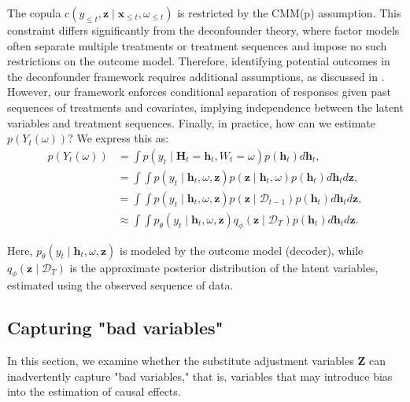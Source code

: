 \documentclass[10pt]{article} %
\begin{document}
The copula \(c(y_{\leq t}, \mathbf{z} \mid \mathbf{x}_{\leq t}, \omega_{\leq t})\) is restricted by the CMM(p) assumption. This constraint differs significantly from the deconfounder theory, where factor models often separate multiple treatments or treatment sequences and impose no such restrictions on the outcome model. Therefore, identifying potential outcomes in the deconfounder framework requires additional assumptions, as discussed in \cite{wang2019blessings, wang2019blessingsreply}. However, our framework enforces conditional separation of responses given past sequences of treatments and covariates, implying independence between the latent variables and treatment sequences.
Finally, in practice, how can we estimate \(p(Y_{t}(\omega))\)? We express this as:
\begin{equation}
\begin{aligned}
p(Y_{t}(\omega)) &= \int p(y_{t} \mid \mathbf{H}_t =  \mathbf{h}_t, W_t = \omega) p(\mathbf{h}_t) d\mathbf{h}_t, \\
&= \int \int  p(y_{t} \mid \mathbf{h}_t, \omega, \mathbf{z}) p(\mathbf{z} \mid \mathbf{h}_t, \omega) p(\mathbf{h}_t) d\mathbf{h}_t d\mathbf{z}, \\
&= \int \int p(y_{t} \mid \mathbf{h}_t, \omega, \mathbf{z}) p(\mathbf{z} \mid \mathcal{D}_{t-1}) p(\mathbf{h}_t) d\mathbf{h}_t d\mathbf{z}, \\
&\approx \int \int p_{\theta}(y_{t} \mid \mathbf{h}_t, \omega, \mathbf{z}) q_{\phi}(\mathbf{z} \mid \mathcal{D}_{T}) p(\mathbf{h}_t) d\mathbf{h}_t d\mathbf{z}.
\end{aligned}
\end{equation}

Here, \(p_{\theta}(y_{t} \mid \mathbf{h}_t, \omega, \mathbf{z})\) is modeled by the outcome model (decoder), while \(q_{\phi}(\mathbf{z} \mid \mathcal{D}_{T})\) is the approximate posterior distribution of the latent variables, estimated using the observed sequence of data.


\subsection{Capturing "bad variables"}
\label{appendix:bad_vars}
In this section, we examine whether the substitute adjustment variables \(\mathbf{Z}\) can inadvertently capture "bad variables," that is, variables that may introduce bias into the estimation of causal effects.
\end{document}
